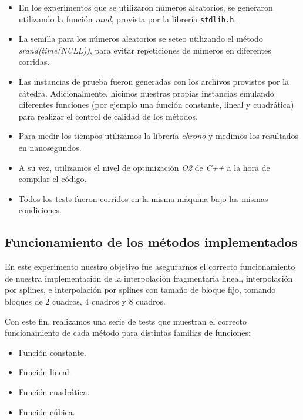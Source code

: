 \begin{itemize}
    \item En los experimentos que se utilizaron números aleatorios, se generaron utilizando la función \textit{rand}, provista por la librería \texttt{stdlib.h}.
    \item La semilla para los números aleatorios se seteo utilizando el método \textit{srand(time(NULL))}, para evitar repeticiones de números en diferentes corridas.
    \item Las instancias de prueba fueron generadas con los archivos provistos por la cátedra. Adicionalmente, hicimos nuestras propias instancias emulando diferentes funciones (por ejemplo una función constante, lineal y cuadrática) para realizar el control de calidad de los métodos.
    \item Para medir los tiempos utilizamos la librería \textit{chrono} y medimos los resultados en nanosegundos.
    \item A su vez, utilizamos el nivel de optimización \textit{O2} de \textit{C++} a la hora de compilar el código.
    \item Todos los tests fueron corridos en la misma máquina bajo las mismas condiciones.
\end{itemize}


\subsection{Funcionamiento de los métodos implementados}
En este experimento nuestro objetivo fue asegurarnos el correcto funcionamiento de nuestra implementación de la interpolación fragmentaria lineal, interpolación por splines, e interpolación por splines con tamaño de bloque fijo, tomando bloques de 2 cuadros, 4 cuadros y 8 cuadros.

Con este fin, realizamos una serie de tests que muestran el correcto funcionamiento de cada método para distintas familias de funciones:
\begin{itemize}
  \item Función constante.
  \item Función lineal.
  \item Función cuadrática.
  \item Función cúbica.
\end{itemize}


